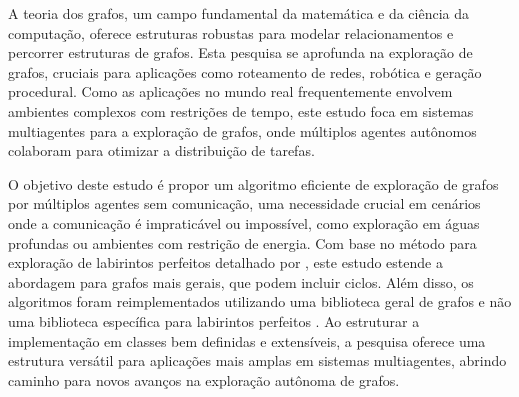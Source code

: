 A teoria dos grafos,
um campo fundamental da matemática e da ciência da computação,
oferece estruturas robustas para modelar relacionamentos e percorrer estruturas de grafos.
Esta pesquisa se aprofunda na exploração de grafos,
cruciais para aplicações como roteamento de redes,
robótica e geração procedural.
Como as aplicações no mundo real frequentemente envolvem ambientes complexos com restrições de tempo,
este estudo foca em sistemas multiagentes para a exploração de grafos,
onde múltiplos agentes autônomos colaboram para otimizar a distribuição de tarefas.

O objetivo deste estudo é propor um algoritmo eficiente de exploração de grafos por múltiplos agentes sem comunicação,
uma necessidade crucial em cenários onde a comunicação é impraticável ou impossível,
como exploração em águas profundas ou ambientes com restrição de energia.
Com base no método para exploração de labirintos perfeitos detalhado por ,
este estudo estende a abordagem para grafos mais gerais, que podem incluir ciclos.
Além disso, os algoritmos foram reimplementados utilizando uma biblioteca geral de grafos e não uma biblioteca 
específica para labirintos perfeitos \cite{Naeem2021}. Ao estruturar a implementação em classes bem definidas e extensíveis,
a pesquisa oferece uma estrutura versátil para aplicações mais amplas em sistemas multiagentes,
abrindo caminho para novos avanços na exploração autônoma de grafos.
